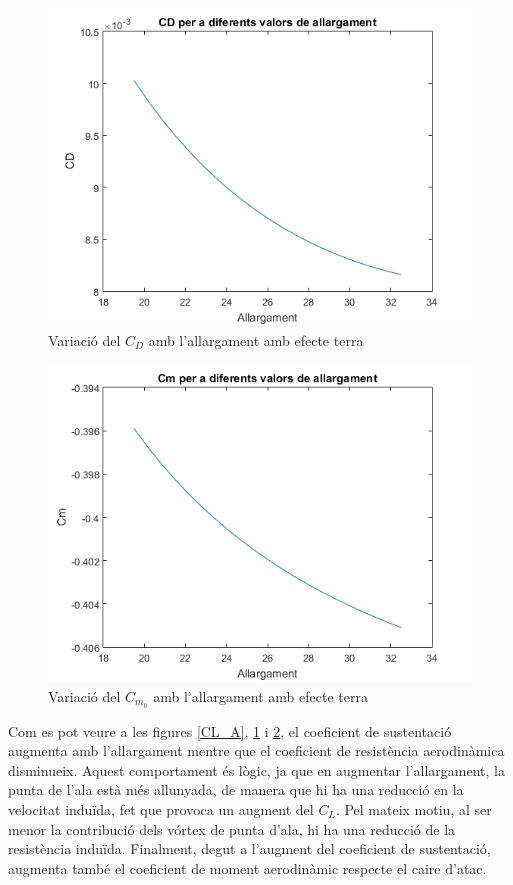 \begin{figure}[H]
	\centering
	\includegraphics[scale=0.9]{./plots/CD_A}
	\caption{Variació del $C_{D}$ amb l'allargament amb efecte terra}
	\label{CD_A}
\end{figure}

\begin{figure}[H]
	\centering
	\includegraphics[]{./plots/Cm_A}
	\caption{Variació del $C_{m_{0}}$ amb l'allargament amb efecte terra}
	\label{Cm_A}
\end{figure}

Com es pot veure a les figures \ref{CL_A}, \ref{CD_A} i \ref{Cm_A}, el coeficient de sustentació augmenta amb l'allargament mentre que el coeficient de resistència aerodinàmica disminueix. Aquest comportament és lògic, ja que en augmentar l'allargament, la punta de l'ala està més allunyada, de manera que hi ha una reducció en la velocitat induïda, fet que provoca un augment del $C_{L}$. Pel mateix motiu, al ser menor la contribució dels vórtex de punta d'ala, hi ha una reducció de la resistència induïda. Finalment, degut a l'augment del coeficient de sustentació, augmenta també el coeficient de moment aerodinàmic respecte el caire d'atac.

